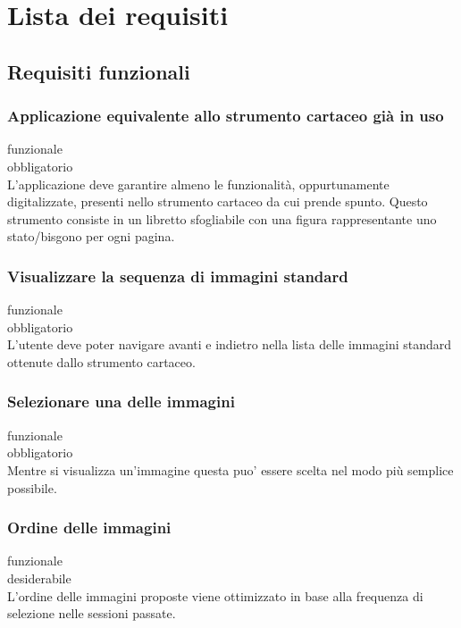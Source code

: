 \chapter{Lista dei requisiti}
\thispagestyle{fancy}

\section{Requisiti funzionali}

\subsection*{Applicazione equivalente allo strumento cartaceo già in uso}
 funzionale \\
 obbligatorio \\
L'applicazione deve garantire almeno le funzionalità, oppurtunamente
digitalizzate, presenti nello strumento cartaceo da cui prende spunto. Questo
strumento consiste in un libretto sfogliabile con una figura rappresentante uno
stato/bisgono per ogni pagina.

\subsection*{Visualizzare la sequenza di immagini standard}
 funzionale \\
 obbligatorio \\
L'utente deve poter navigare avanti e indietro nella lista delle immagini
standard ottenute dallo strumento cartaceo.

\subsection*{Selezionare una delle immagini}
 funzionale \\
 obbligatorio \\
Mentre si visualizza un'immagine questa puo' essere scelta nel modo pi\`u
semplice possibile.

\subsection*{Ordine delle immagini}
 funzionale \\
 desiderabile \\
L'ordine delle immagini proposte viene ottimizzato in base alla frequenza di
selezione nelle sessioni passate.

